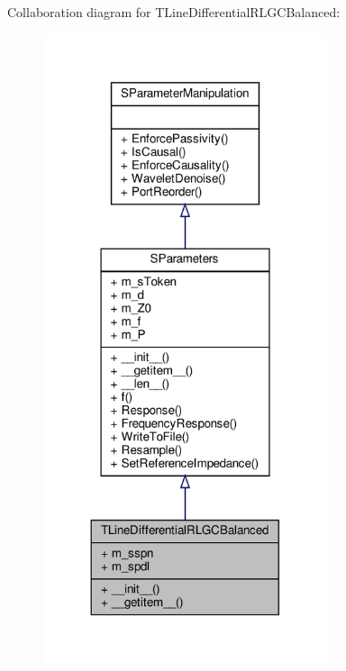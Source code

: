 Collaboration diagram for T\+Line\+Differential\+R\+L\+G\+C\+Balanced\+:\nopagebreak
\begin{figure}[H]
\begin{center}
\leavevmode
\includegraphics[width=236pt]{classSignalIntegrity_1_1SParameters_1_1Devices_1_1TLineDifferentialRLGCBalanced_1_1TLineDifferentialRLGCBalanced__coll__graph}
\end{center}
\end{figure}
